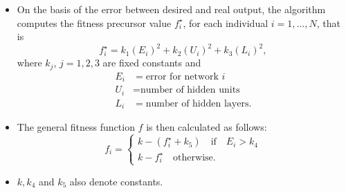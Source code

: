 \documentclass{beamer}
\begin{document}
\begin{frame}
\begin{itemize}
\item On the basis of the error between desired and real output, the algorithm computes the fitness precursor value $f_i^{\star}$, for each individual $i = 1, \dots, N$, that is
\begin{equation*}
f_i^{\star} = k_1(E_i)^2 + k_2(U_i)^2 + k_3(L_i)^2,
\end{equation*}
where $k_j$, $j = 1,2,3$ are fixed constants and
\begin{align*}
    E_i &= \text{error for network }i\\
    U_i &= \text{number of hidden units}\\
  	L_i &= \text{number of hidden layers}.
\end{align*}
\item The general fitness function  $f$ is then calculated as follows:
$$
f_i = \begin{cases}
k - (f_i^{\star} + k_5) \quad \text{if} \quad E_i > k_4 \\
k - f_i^{\star} \quad \text{otherwise.}
\end{cases} 
$$ 
\item $k, k_4$ and $k_5$ also denote constants.
\end{itemize}
\end{frame}
\end{document}
